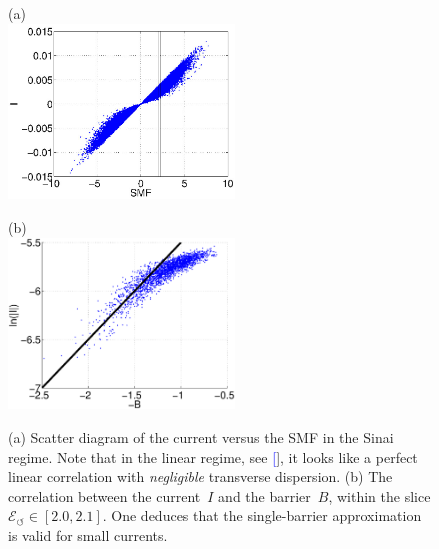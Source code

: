 \documentclass[aps,prl,floats,floatfix,twocolumn]{revtex4}
\renewcommand{\cite}[1]{\textcolor{blue}{[\onlinecite{#1}}]} %
\begin{document}
\begin{figure}

\hspace*{-10mm} (a) \\
\includegraphics[width=6cm]{IvsSMF2.jpg}

\vspace*{5mm}

\hspace*{-10mm} (b) \\
\includegraphics[width=6cm]{BvsLnI.eps}

\caption{(a) Scatter diagram of the current versus the SMF in the Sinai regime.
Note that in the linear regime, see \cite{SM}, it looks like a perfect linear 
correlation with {\em negligible} transverse dispersion.  
(b) The correlation between the current~$I$ and the barrier~$B$,  
within the slice ${\mathcal{E}_{\circlearrowleft} \in [2.0,2.1]}$. 
One deduces that the single-barrier approximation is valid for small currents.}

\label{f4}
\end{figure}
\end{document}
